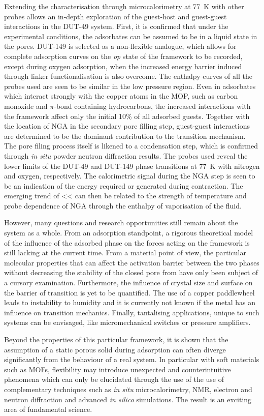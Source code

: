 Extending the characterisation through microcalorimetry at \SI{77}{\kelvin}
with other probes allows an in-depth exploration of the guest-host and 
guest-guest interactions in the DUT-49 system. First, it is confirmed 
that under the experimental conditions, the adsorbates can be assumed to 
be in a liquid state in the pores. DUT-149 is selected as a non-flexible 
analogue, which allows for complete adsorption curves on the \textit{op}
state of the framework to be recorded, except during oxygen adsorption,
when the increased energy barrier induced through linker functionalisation
is also overcome. The enthalpy curves of all the probes used are seen to 
be similar in the low pressure region. Even in adsorbates which interact 
strongly with the copper atoms in the \gls{MOP}, such as carbon 
monoxide and \(\pi\)-bond containing hydrocarbons, the 
increased interactions with the 
framework affect only the initial 10\% of all adsorbed guests. Together
with the location of \gls{NGA} in the secondary pore filling step,
guest-guest interactions are determined to be the dominant contribution 
to the transition mechanism. The pore filing process itself is likened
to a condensation step, which is confirmed through \textit{in situ}
powder neutron diffraction results.
The probes used reveal the lower limits of the DUT-49
and DUT-149 phase transitions at \SI{77}{\kelvin} with nitrogen and 
oxygen, respectively. The calorimetric signal during the \gls{NGA} step
is seen to be an indication of the energy required or generated 
during contraction. The emerging trend of <<
can then be related to the strength of temperature and probe dependence
of \gls{NGA} through the enthalpy of vaporisation of the fluid.

However, many questions and research opportunities still remain about the 
system as a whole. From an adsorption standpoint, a rigorous theoretical 
model of the influence of the adsorbed phase on the forces acting on the
framework is still lacking at the current time.
From a material point of view, the particular molecular properties that 
can affect the activation barrier between the two phases without 
decreasing the stability of the closed pore from have only been 
subject of a cursory examination.
Furthermore, the influence of crystal size and surface on the
barrier of transition is yet to be quantified. The use of a copper 
paddlewheel leads to instability to humidity and it is currently
not known if the metal has an influence on transition mechanics.
Finally, tantalising applications, unique to such systems can be 
envisaged, like micromechanical switches or pressure amplifiers.

Beyond the properties of this particular framework, it is shown that 
the assumption of a static porous solid during adsorption can often
diverge significantly from the behaviour of a real system. In particular
with soft materials such as \glspl{MOF}, flexibility may introduce 
unexpected and counterintuitive phenomena which can only be elucidated 
through the use of the use of complementary techniques such as 
\textit{in situ} microcalorimetry, \gls{NMR}, electron and neutron diffraction 
and advanced \textit{in silico} simulations. The result is an 
exciting area of fundamental science.

\FloatBarrier%
\pagebreak